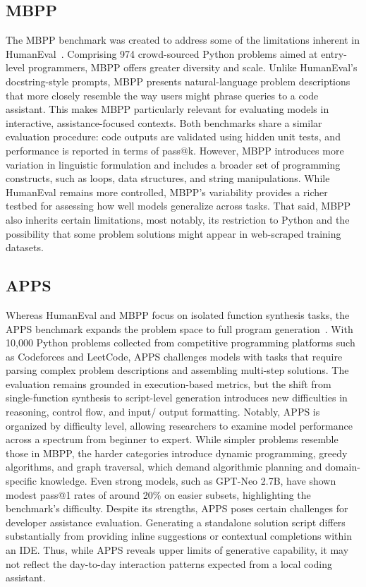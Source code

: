\subsection{MBPP}
The \Gls{MBPP} benchmark was created to address some of the limitations inherent in HumanEval~\autocite{Austin2021}. Comprising 974 crowd-sourced Python problems aimed at entry-level programmers, \gls{MBPP} offers greater diversity and scale. Unlike HumanEval’s docstring-style prompts, \gls{MBPP} presents natural-language problem descriptions that more closely resemble the way users might phrase queries to a code assistant. This makes \gls{MBPP} particularly relevant for evaluating models in interactive, assistance-focused contexts. Both benchmarks share a similar evaluation procedure: code outputs are validated using hidden unit tests, and performance is reported in terms of pass@k. However, \gls{MBPP} introduces more variation in linguistic formulation and includes a broader set of programming constructs, such as loops, data structures, and string manipulations. While HumanEval remains more controlled, \gls{MBPP}’s variability provides a richer testbed for assessing how well models generalize across tasks. That said, \gls{MBPP} also inherits certain limitations, most notably, its restriction to Python and the possibility that some problem solutions might appear in web-scraped training datasets.

\subsection{APPS}
Whereas HumanEval and \gls{MBPP} focus on isolated function synthesis tasks, the \Gls{APPS} benchmark expands the problem space to full program generation~\autocite{Hendrycks2021}. With 10,000 Python problems collected from competitive programming platforms such as Codeforces and LeetCode, \gls{APPS} challenges models with tasks that require parsing complex problem descriptions and assembling multi-step solutions. The evaluation remains grounded in execution-based metrics, but the shift from single-function synthesis to script-level generation introduces new difficulties in reasoning, control flow, and input/ output formatting. Notably, \gls{APPS} is organized by difficulty level, allowing researchers to examine model performance across a spectrum from beginner to expert. While simpler problems resemble those in \gls{MBPP}, the harder categories introduce dynamic programming, greedy algorithms, and graph traversal, which demand algorithmic planning and domain-specific knowledge. Even strong models, such as GPT-Neo 2.7B, have shown modest pass@1 rates of around 20\% on easier subsets, highlighting the benchmark’s difficulty. Despite its strengths, \gls{APPS} poses certain challenges for developer assistance evaluation. Generating a standalone solution script differs substantially from providing inline suggestions or contextual completions within an IDE. Thus, while \gls{APPS} reveals upper limits of generative capability, it may not reflect the day-to-day interaction patterns expected from a local coding assistant.

